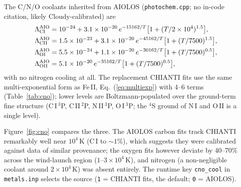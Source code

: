 \documentclass[english,a4paper]{my_memo}
\begin{document}
The C/N/O coolants inherited from AIOLOS (\texttt{photochem.cpp}; no
in-code citation, likely Cloudy-calibrated) are
\begin{align}
\Lambda_{\rm CI}^{\rm AIO}  &= 10^{-24} + 3.1\times10^{-20}\,
   e^{-15162/T}\bigl[1+(T/2\times10^4)^{1.5}\bigr],\nonumber\\
\Lambda_{\rm CII}^{\rm AIO} &= 1.5\times10^{-23} + 3.1\times10^{-20}\,
   e^{-45162/T}\bigl[1+(T/7500)^{1.5}\bigr],\nonumber\\
\Lambda_{\rm OI}^{\rm AIO}  &= 5.5\times10^{-24} + 1.1\times10^{-20}\,
   e^{-30162/T}\bigl[1+(T/7500)^{0.5}\bigr],\nonumber\\
\Lambda_{\rm OII}^{\rm AIO} &= 5.1\times10^{-20}\,
   e^{-35162/T}\bigl[1+(T/7500)^{0.5}\bigr],
\label{eq:aiolos}
\end{align}
with no nitrogen cooling at all.  The replacement CHIANTI fits use the
same multi-exponential form as Fe\,II,
Eq.~(\ref{eq:multiexp}) with 4--6 terms (Table~\ref{tab:cno}); lower
levels are Boltzmann-populated over the ground-term fine structure
(C\,I\,$^3$P, C\,II\,$^2$P, N\,II\,$^3$P, O\,I\,$^3$P; the $^4$S
ground of N\,I and O\,II is a single level).

Figure~\ref{fig:cno} compares the three.  The AIOLOS carbon fits track
CHIANTI remarkably well near $10^4$\,K (C\,I to ${\sim}1\%$), which
suggests they were calibrated against data of similar provenance; the
oxygen fits however deviate by 40--70\% across the wind-launch region
($1$--$3\times10^4$\,K), and nitrogen (a non-negligible coolant
around $2\times10^4$\,K) was absent entirely.  The runtime key
\texttt{cno\_cool} in \texttt{metals.inp} selects the source
(\texttt{1} = CHIANTI fits, the default; \texttt{0} = AIOLOS).
\end{document}
